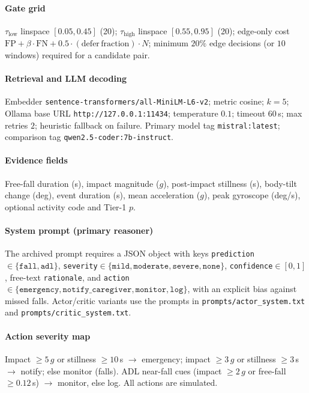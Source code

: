 \documentclass[journal]{IEEEtran}
\begin{document}
\paragraph{Gate grid}
$\tau_{\mathrm{low}}$ linspace $[0.05,0.45]$ (20); $\tau_{\mathrm{high}}$
linspace $[0.55,0.95]$ (20); edge-only cost
$\mathrm{FP}+\beta\cdot\mathrm{FN}+0.5\cdot(\mathrm{defer\,fraction})\cdot N$;
minimum $20\%$ edge decisions (or $10$ windows) required for a candidate pair.

\paragraph{Retrieval and LLM decoding}
Embedder \texttt{sentence-transformers/all-MiniLM-L6-v2}; metric cosine;
$k{=}5$; Ollama base URL \texttt{http://127.0.0.1:11434}; temperature $0.1$;
timeout $60$\,s; max retries $2$; heuristic fallback on failure. Primary model
tag \texttt{mistral:latest}; comparison tag
\texttt{qwen2.5-coder:7b-instruct}.

\paragraph{Evidence fields}
Free-fall duration (s), impact magnitude ($g$), post-impact stillness (s),
body-tilt change (deg), event duration (s), mean acceleration ($g$), peak
gyroscope (deg/s), optional activity code and Tier-1 $p$.

\paragraph{System prompt (primary reasoner)}
The archived prompt requires a JSON object with keys
\texttt{prediction}$\in\{\texttt{fall},\texttt{adl}\}$,
\texttt{severity}$\in\{\texttt{mild},\texttt{moderate},\texttt{severe},\texttt{none}\}$,
\texttt{confidence}$\in[0,1]$, free-text \texttt{rationale}, and
\texttt{action}$\in\{\texttt{emergency},\texttt{notify\_caregiver},\texttt{monitor},\texttt{log}\}$,
with an explicit bias against missed falls. Actor/critic variants use the
prompts in \texttt{prompts/actor\_system.txt} and
\texttt{prompts/critic\_system.txt}.

\paragraph{Action severity map}
Impact $\ge 5\,g$ or stillness $\ge 10$\,s $\rightarrow$ emergency; impact
$\ge 3\,g$ or stillness $\ge 3$\,s $\rightarrow$ notify; else monitor (falls).
ADL near-fall cues (impact $\ge 2\,g$ or free-fall $\ge 0.12$\,s) $\rightarrow$
monitor, else log. All actions are simulated.
\end{document}
